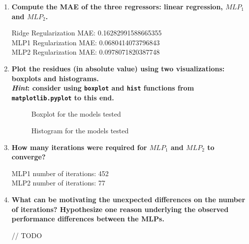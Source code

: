 \documentclass[12pt]{article}
\begin{document}
\begin{enumerate}[leftmargin=\labelsep,resume]
    \item {\color{questioncolor}\bfseries
          Compute the MAE of the three regressors: linear regression, $MLP_1$ and $MLP_2$.
          }\\
          \vspace{0.5em}

          Ridge Regularization MAE: 0.16282991588665355\\
          MLP1 Regularization MAE: 0.0680414073796843\\
          MLP2 Regularization MAE: 0.0978071820387748


    \item {\color{questioncolor}\bfseries
          Plot the residues (in absolute value) using two visualizations: boxplots
          and histograms.\\
          \textit{Hint}: consider using \texttt{boxplot} and \texttt{hist} functions
          from \texttt{matplotlib.pyplot} to this end.
          }\\
          \vspace{0.5em}

          \begin{figure}[H]
              \centering
              
              \caption{Boxplot for the models tested}
              \label{fig:bloxplot}
          \end{figure}

          \begin{figure}[H]
              \centering
              
              \caption{Histogram for the models tested}
              \label{fig:histogram}
          \end{figure}

    \item {\color{questioncolor}\bfseries
          How many iterations were required for $MLP_1$ and $MLP_2$ to converge?
          }\\
          \vspace{0.5em}

          MLP1 number of iterations: 452\\
          MLP2 number of iterations: 77

    \item {\color{questioncolor}\bfseries
          What can be motivating the unexpected differences on the number of iterations?
          Hypothesize one reason underlying the observed performance differences between the MLPs.
          }\\
          \vspace{0.5em}

          // TODO

\end{enumerate}
\end{document}
